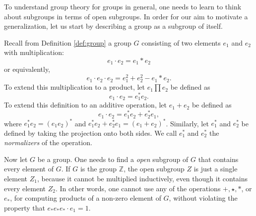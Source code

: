 \documentclass[a4paper,reqno,oneside]{article}
\begin{document}
To understand group theory for groups in general, one needs to learn to think about subgroups in terms of open subgroups. In order for our aim to motivate a generalization, let us start by describing a group as a subgroup of itself. 

Recall from Definition \ref{def:group} a group $G$ consisting of two elements $e_1$ and $e_2$ with multiplication: 
\[
e_1 \cdot e_2 = e_1 * e_2
\]
or equivalently, 
\[
e_1 \cdot e_2 \cdot e_2 = e_1^2 + e_2^2 - e_1 * e_2.
\]
To extend this multiplication to a product, let $e_1 \prod e_2$ be defined as 
\[
e_1 \cdot e_2 = e_1^*e_2.
\]
To extend this definition to an additive operation, let $e_1 + e_2$ be defined as 
\[
e_1 \cdot e_2 = e_1^*e_2 + e_2^*e_1,
\]
where $e_1^*e_2 = (e_1e_2)^*$ and $e_1^*e_2 + e_2^*e_1 = (e_1 + e_2)^*$. Similarly, let $e_1^*$ and $e_2^*$ be defined by taking the projection onto both sides. We call $e_1^*$ and $e_2^*$ the \emph{normalizers} of the operation. 

Now let $G$ be a group. One needs to find a \emph{open} subgroup of $G$ that contains every element of $G$. If $G$ is the group $\mathbb Z$, the open subgroup $Z$ is just a single element $Z_1$, because it cannot be multiplied inductively, even though it contains every element $Z_2$. In other words, one cannot use any of the operations $+, \star, *$, or $e_*$, for computing products of a non-zero element of $G$, without violating the property that $e_*e_*e_* \cdot e_1 = 1$. 
\end{document}
